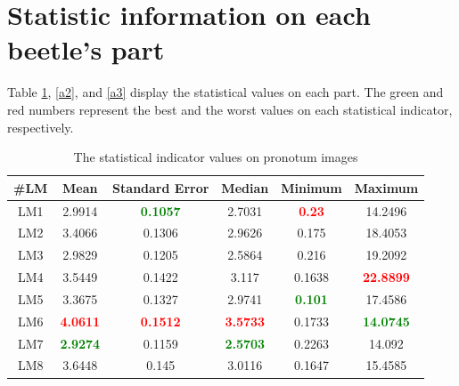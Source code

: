\documentclass[review]{elsarticle}
\begin{document}
\section{Statistic information on each beetle's part}
\label{appdixA}
Table \ref{a1}, \ref{a2}, and \ref{a3} display the statistical values on each part. The green and red numbers represent the best and the worst values on each statistical indicator, respectively.  
\begin{table}[htbp]
\begin{tabular}{ | c | c | c | c | c | c | }
\hline
	\textbf{\#LM} & \textbf{Mean} & \textbf{Standard Error} & \textbf{Median} & \textbf{Minimum} & \textbf{Maximum} \\ \hline
	LM1 & 2.9914 & \textcolor{green}{\textbf{0.1057}} & 2.7031 & \textcolor{red}{\textbf{0.23}} & 14.2496 \\ \hline
	LM2 & 3.4066 & 0.1306 & 2.9626 & 0.175 & 18.4053 \\ \hline
	LM3 & 2.9829 & 0.1205 & 2.5864 & 0.216 & 19.2092 \\ \hline
	LM4 & 3.5449 & 0.1422 & 3.117 & 0.1638 & \textcolor{red}{\textbf{22.8899}} \\ \hline
	LM5 & 3.3675 & 0.1327 & 2.9741 & \textcolor{green}{\textbf{0.101}} & 17.4586 \\ \hline
	LM6 & \textcolor{red}{\textbf{4.0611}} & \textcolor{red}{\textbf{0.1512}} & \textcolor{red}{\textbf{3.5733}} & 0.1733 & \textcolor{green}{\textbf{14.0745}} \\ \hline
	LM7 & \textcolor{green}{\textbf{2.9274}} & 0.1159 & \textcolor{green}{\textbf{2.5703}} & 0.2263 & 14.092 \\ \hline
	LM8 & 3.6448 & 0.145 & 3.0116 & 0.1647 & 15.4585 \\ \hline
\end{tabular}
\caption{The statistical indicator values on pronotum images}
\label{a1}
\end{table}
\end{document}
